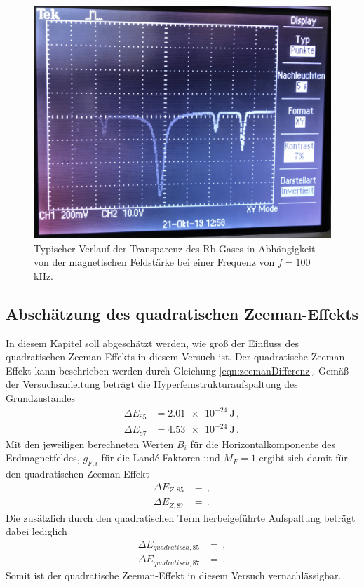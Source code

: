 \begin{figure}
  \centering
  \includegraphics[width=\textwidth]{data/foto.jpg}
  \caption{Typischer Verlauf der Transparenz des Rb-Gases in Abhängigkeit von der magnetischen Feldstärke bei einer Frequenz von $f=100\,$kHz.}
  \label{fig:foto}
\end{figure}

\subsection{Abschätzung des quadratischen Zeeman-Effekts}
\label{subsec:zeeman}
In diesem Kapitel soll abgeschätzt werden, wie groß der Einfluss des quadratischen Zeeman-Effekts
in diesem Versuch ist. Der quadratische Zeeman-Effekt kann beschrieben werden durch Gleichung
\eqref{eqn:zeemanDifferenz}. Gemäß der Versuchsanleitung \cite{Versuchsanleitung} beträgt die
Hyperfeinstrukturaufspaltung des Grundzustandes
\begin{align*}
  \Delta E_{85}&= \SI{2.01e-24}{\joule}\,,\\
  \Delta E_{87}&= \SI{4.53e-24}{\joule}\,.
\end{align*}
Mit den jeweiligen berechneten Werten $B_i$ für die Horizontalkomponente des Erdmagnetfeldes,
$g_{F,i}$ für die Landé-Faktoren und $M_F=1$ ergibt sich damit für den quadratischen Zeeman-Effekt
\begin{align*}
  \Delta E_{Z,85}&= \,,\\
  \Delta E_{Z,87}&= \,.
\end{align*}
Die zusätzlich durch den quadratischen Term herbeigeführte Aufspaltung beträgt dabei lediglich
\begin{align*}
  \Delta E_{quadratisch,85}&= \,,\\
  \Delta E_{quadratisch,87}&= \,.
\end{align*}
Somit ist der quadratische Zeeman-Effekt in diesem Versuch vernachlässigbar.

